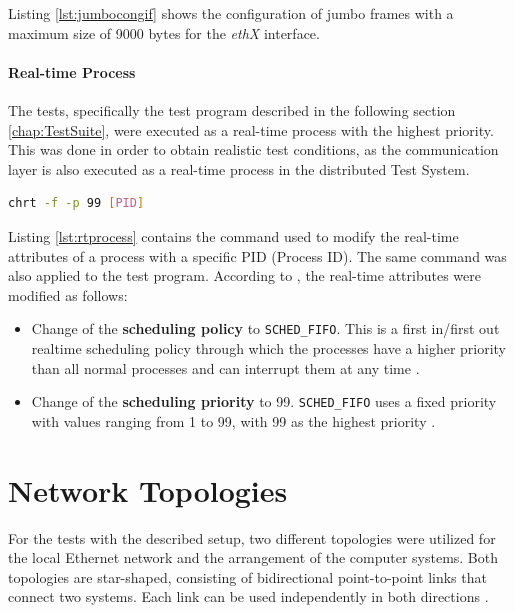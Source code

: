 Listing \ref{lst:jumbocongif} shows the configuration of jumbo frames with a maximum size of 9000 bytes for the \textit{ethX} interface.


\paragraph{Real-time Process} \label{chap:RTProcess}
The tests, specifically the test program described in the following section \ref{chap:TestSuite}, were executed as a real-time process with the highest priority. This was done in order to obtain realistic test conditions, as the communication layer is also executed as a real-time process in the distributed Test System. \\

\begin{lstlisting}[language=Bash, caption=Modification of the real-time Attributes of a Process., label=lst:rtprocess]
chrt -f -p 99 [PID]
\end{lstlisting}

Listing \ref{lst:rtprocess} contains the command used to modify the real-time attributes of a process with a specific PID (Process ID). The same command was also applied to the test program. According to \cite{swsetup05}, the real-time attributes were modified as follows:

\begin{itemize}
\item Change of the \textbf{scheduling policy} to \texttt{SCHED\_FIFO}. This is a first in/first out realtime scheduling policy through which the processes have a higher priority than all normal processes and can interrupt them at any time \cite{swsetup06}.
\item Change of the \textbf{scheduling priority} to 99. \texttt{SCHED\_FIFO} uses a fixed priority with values ranging from 1 to 99, with 99 as the highest priority \cite{swsetup06}.
\end{itemize}



\section{Network Topologies} \label{chap:Architectures}
For the tests with the described setup, two different topologies were utilized for the local Ethernet network and the arrangement of the computer systems. Both topologies are star-shaped, consisting of bidirectional point-to-point links that connect two systems. Each link can be used independently in both directions \cite{Tanenbaum2010}.


